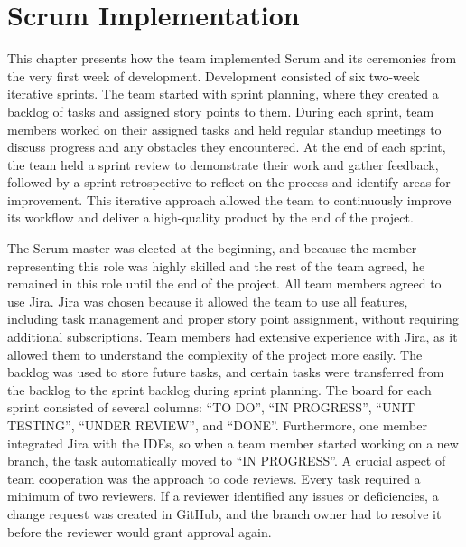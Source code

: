 \section{Scrum Implementation}

\hspace*{1cm}This chapter presents how the team implemented Scrum and its ceremonies from the very first week of development. Development consisted of six two-week iterative sprints. The team started with sprint planning, where they created a backlog of tasks and assigned story points to them. During each sprint, team members worked on their assigned tasks and held regular standup meetings to discuss progress and any obstacles they encountered. At the end of each sprint, the team held a sprint review to demonstrate their work and gather feedback, followed by a sprint retrospective to reflect on the process and identify areas for improvement. This iterative approach allowed the team to continuously improve its workflow and deliver a high-quality product by the end of the project.

\medskip

\hspace*{1cm}The Scrum master was elected at the beginning, and because the member representing this role was highly skilled and the rest of the team agreed, he remained in this role until the end of the project. All team members agreed to use Jira. Jira was chosen because it allowed the team to use all features, including task management and proper story point assignment, without requiring additional subscriptions. Team members had extensive experience with Jira, as it allowed them to understand the complexity of the project more easily. The backlog was used to store future tasks, and certain tasks were transferred from the backlog to the sprint backlog during sprint planning. The board for each sprint consisted of several columns: “TO DO”, “IN PROGRESS”, “UNIT TESTING”, “UNDER REVIEW”, and “DONE”. Furthermore, one member integrated Jira with the IDEs, so when a team member started working on a new branch, the task automatically moved to “IN PROGRESS”. A crucial aspect of team cooperation was the approach to code reviews. Every task required a minimum of two reviewers. If a reviewer identified any issues or deficiencies, a change request was created in GitHub, and the branch owner had to resolve it before the reviewer would grant approval again.

